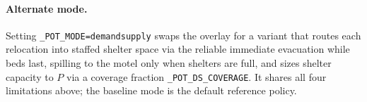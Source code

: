 \documentclass[11pt]{article}
\newcommand{\code}[1]{{\texttt{\small #1}}}
\newcommand{\py}[1]{{\color{pyorange}\texttt{\small #1}}}
\begin{document}
\paragraph{Alternate mode.} Setting \py{\_POT\_MODE}\code{=demandsupply} swaps the overlay for a
variant that routes each relocation into staffed shelter space via the reliable immediate
evacuation while beds last, spilling to the motel only when shelters are full, and sizes shelter
capacity to $P$ via a coverage fraction \py{\_POT\_DS\_COVERAGE}. It shares all four limitations
above; the baseline mode is the default reference policy.
\end{document}
